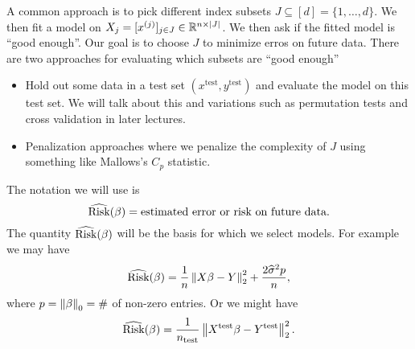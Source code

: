 A common approach is to pick different index subsets $J \subseteq [d] = \{1,\ldots, d\}$. We then fit a model on $X_j = [x^{(j)}]_{j \in J} \in {\mathbb R}^{n \times {\left\lvert J\right\rvert}}$. We then ask if the fitted model is ``good enough''. Our goal is to choose $J$ to minimize erros on future data. There are two approaches for evaluating which subsets are ``good enough''
\begin{itemize}
    \item Hold out some data in a test set $(x^{\text{test}}, y^{\text{test}})$ and evaluate the model on this test set. We will talk about this and variations such as permutation tests and cross validation in later lectures.
    \item Penalization approaches where we penalize the complexity of $J$ using something like Mallows's $C_p$ statistic.
\end{itemize}
The notation we will use is
\[\widehat{\text{Risk}}(\beta) = \text{estimated error or risk on future data}.\]
The quantity $\widehat{\text{Risk}}(\beta)$ will be the basis for which we select models. For example we may have 
\[\widehat{\text{Risk}}(\beta) = \frac{1}{n}\left\|X \beta - Y\right\|_2^2 + \frac{2\widehat{\sigma}^2p}{n}, \]
where $p = \left\|\beta\right\|_0 = \#$ of non-zero entries. Or we might have
\[\widehat{\text{Risk}}(\beta) = \frac{1}{n_{\text{test}}}\left\|X^\text{test}\beta - Y^{\text{test}}\right\|_2^2. \]
